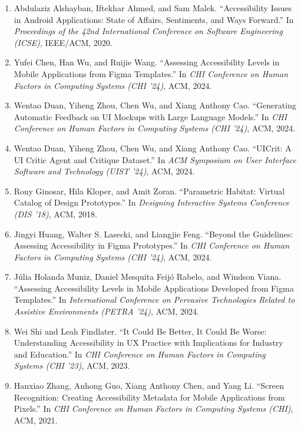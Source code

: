 \documentclass[12pt]{article}
\begin{document}
\begin{enumerate}
\item Abdulaziz Alshayban, Iftekhar Ahmed, and Sam Malek. “Accessibility Issues in Android Applications: State of Affairs, Sentiments, and Ways Forward.” In \textit{Proceedings of the 42nd International Conference on Software Engineering (ICSE)}, IEEE/ACM, 2020.
\item Yufei Chen, Han Wu, and Ruijie Wang. “Assessing Accessibility Levels in Mobile Applications from Figma Templates.” In \textit{CHI Conference on Human Factors in Computing Systems (CHI ’24)}, ACM, 2024.
\item Wentao Duan, Yiheng Zhou, Chen Wu, and Xiang Anthony Cao. “Generating Automatic Feedback on UI Mockups with Large Language Models.” In \textit{CHI Conference on Human Factors in Computing Systems (CHI ’24)}, ACM, 2024.
\item Wentao Duan, Yiheng Zhou, Chen Wu, and Xiang Anthony Cao. “UICrit: A UI Critic Agent and Critique Dataset.” In \textit{ACM Symposium on User Interface Software and Technology (UIST ’24)}, ACM, 2024.
\item Rony Ginosar, Hila Kloper, and Amit Zoran. “Parametric Habitat: Virtual Catalog of Design Prototypes.” In \textit{Designing Interactive Systems Conference (DIS ’18)}, ACM, 2018.
\item Jingyi Huang, Walter S. Lasecki, and Liangjie Feng. “Beyond the Guidelines: Assessing Accessibility in Figma Prototypes.” In \textit{CHI Conference on Human Factors in Computing Systems (CHI ’24)}, ACM, 2024.
\item Júlia Holanda Muniz, Daniel Mesquita Feijó Rabelo, and Windson Viana. “Assessing Accessibility Levels in Mobile Applications Developed from Figma Templates.” In \textit{International Conference on Pervasive Technologies Related to Assistive Environments (PETRA ’24)}, ACM, 2024.
\item Wei Shi and Leah Findlater. “It Could Be Better, It Could Be Worse: Understanding Accessibility in UX Practice with Implications for Industry and Education.” In \textit{CHI Conference on Human Factors in Computing Systems (CHI ’23)}, ACM, 2023.
\item Hanxiao Zhang, Anhong Guo, Xiang Anthony Chen, and Yang Li. “Screen Recognition: Creating Accessibility Metadata for Mobile Applications from Pixels.” In \textit{CHI Conference on Human Factors in Computing Systems (CHI)}, ACM, 2021.
\end{enumerate}
\end{document}
